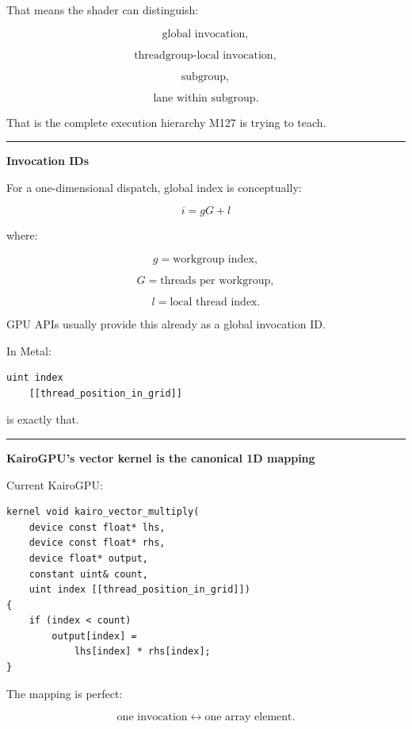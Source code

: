 That means the shader can distinguish:

\[
\text{global invocation},
\]

\[
\text{threadgroup-local invocation},
\]

\[
\text{subgroup},
\]

\[
\text{lane within subgroup}.
\]

That is the complete execution hierarchy M127 is trying to teach.

\begin{center}\rule{0.5\linewidth}{0.5pt}\end{center}

\textbf{Invocation IDs}

For a one-dimensional dispatch, global index is conceptually:

\[
\boxed{
i=
gG+l
}
\]

where:

\[
g=\text{workgroup index},
\]

\[
G=\text{threads per workgroup},
\]

\[
l=\text{local thread index}.
\]

GPU APIs usually provide this already as a global invocation ID.

In Metal:

\protect{}\label{0x8pi8}%
\begin{verbatim}
uint index
    [[thread_position_in_grid]]
\end{verbatim}

is exactly that.

\begin{center}\rule{0.5\linewidth}{0.5pt}\end{center}

\textbf{KairoGPU's vector kernel is the canonical 1D mapping}

Current KairoGPU:

\protect{}\label{v6nvzv}%
\begin{verbatim}
kernel void kairo_vector_multiply(
    device const float* lhs,
    device const float* rhs,
    device float* output,
    constant uint& count,
    uint index [[thread_position_in_grid]])
{
    if (index < count)
        output[index] =
            lhs[index] * rhs[index];
}
\end{verbatim}

The mapping is perfect:

\[
\boxed{
\text{one invocation}
\leftrightarrow
\text{one array element}.
}
\]


